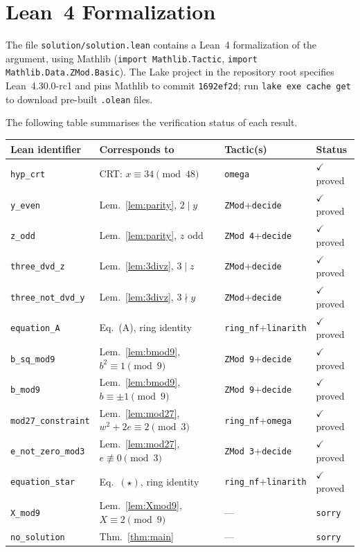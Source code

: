 \documentclass[12pt,a4paper]{article}
\begin{document}
\section{Lean~4 Formalization}
\label{sec:lean}

The file \texttt{solution/solution.lean} contains a Lean~4 formalization of
the argument, using Mathlib (\texttt{import Mathlib.Tactic},
\texttt{import Mathlib.Data.ZMod.Basic}).
The Lake project in the repository root specifies Lean~4.30.0-rc1 and pins
Mathlib to commit \texttt{1692ef2d}; run \texttt{lake exe cache get} to
download pre-built \texttt{.olean} files.

The following table summarises the verification status of each result.

\begin{center}
\renewcommand{\arraystretch}{1.3}
\begin{tabular}{llll}
\hline
\textbf{Lean identifier} & \textbf{Corresponds to} & \textbf{Tactic(s)} & \textbf{Status} \\
\hline
\texttt{hyp\_crt} & CRT: $x\equiv34\pmod{48}$ & \texttt{omega} & $\checkmark$ proved \\
\texttt{y\_even} & Lem.~\ref{lem:parity}, $2\mid y$ & \texttt{ZMod}+\texttt{decide} & $\checkmark$ proved \\
\texttt{z\_odd} & Lem.~\ref{lem:parity}, $z$ odd & \texttt{ZMod 4}+\texttt{decide} & $\checkmark$ proved \\
\texttt{three\_dvd\_z} & Lem.~\ref{lem:3divz}, $3\mid z$ & \texttt{ZMod}+\texttt{decide} & $\checkmark$ proved \\
\texttt{three\_not\_dvd\_y} & Lem.~\ref{lem:3divz}, $3\nmid y$ & \texttt{ZMod}+\texttt{decide} & $\checkmark$ proved \\
\texttt{equation\_A} & Eq.~(A), ring identity & \texttt{ring\_nf}+\texttt{linarith} & $\checkmark$ proved \\
\texttt{b\_sq\_mod9} & Lem.~\ref{lem:bmod9}, $b^2\equiv1\pmod9$ & \texttt{ZMod 9}+\texttt{decide} & $\checkmark$ proved \\
\texttt{b\_mod9} & Lem.~\ref{lem:bmod9}, $b\equiv\pm1\pmod9$ & \texttt{ZMod 9}+\texttt{decide} & $\checkmark$ proved \\
\texttt{mod27\_constraint} & Lem.~\ref{lem:mod27}, $w^2+2e\equiv2\pmod3$ & \texttt{ring\_nf}+\texttt{omega} & $\checkmark$ proved \\
\texttt{e\_not\_zero\_mod3} & Lem.~\ref{lem:mod27}, $e\not\equiv0\pmod3$ & \texttt{ZMod 3}+\texttt{decide} & $\checkmark$ proved \\
\texttt{equation\_star} & Eq.~$(\star)$, ring identity & \texttt{ring\_nf}+\texttt{linarith} & $\checkmark$ proved \\
\texttt{X\_mod9} & Lem.~\ref{lem:Xmod9}, $X\equiv2\pmod9$ & --- & \texttt{sorry} \\
\texttt{no\_solution} & Thm.~\ref{thm:main} & --- & \texttt{sorry} \\
\hline
\end{tabular}
\end{center}
\end{document}
